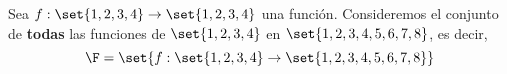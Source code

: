 \begin{enunciado}{\ejercicio}
        Sea $f: \set{1,2,3,4} \to \set{1,2,3,4}$ una función.
        Consideremos el conjunto de \textbf{todas} las funciones de $\set{1,2,3,4}$ en $\set{1,2,3,4,5,6,7,8}$, es decir,
        $$
        \F = \set{f: \set{1,2,3,4} \to \set{1,2,3,4,5,6,7,8}}
        $$
\end{enunciado}
